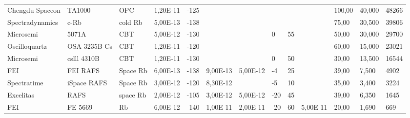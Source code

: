 \begin{table}[H]
{\begin{tabular}{ll|lllllllllll}
            Chengdu Spaceon & TA1000           & OPC           & 1,20E-11      & -125                   & ~              & ~                & ~                      & ~                      & ~               & 100,00         & 40,000          & 48266                   \\
            Spectradynamics & c-Rb             & cold Rb       & 5,00E-13      & -138                   & ~              & ~                & ~                      & ~                      & ~               & 75,00          & 30,500          & 39806                   \\
            Microsemi       & 5071A            & CBT           & 5,00E-12      & -130                   & ~              & ~                & 0                      & 55                     & ~               & 50,00          & 30,000          & 29700                   \\
            Oscilloquartz   & OSA 3235B Cs     & CBT           & 1,20E-11      & -120                   & ~              & ~                & ~                      & ~                      & ~               & 60,00          & 15,000          & 23021                   \\
            Microsemi       & cslll 4310B      & CBT           & 1,20E-11      & -130                   & ~              & ~                & 0                      & 50                     & ~               & 30,00          & 13,500          & 16544                   \\
            FEI             & FEI RAFS         & Space Rb      & 6,00E-13      & -138                   & 9,00E-13       & 5,00E-12         & -4                     & 25                     & ~               & 39,00          & 7,500           & 4902                    \\
            Spectratime     & iSpace RAFS      & Space Rb      & 3,00E-12      & -120                   & 8,30E-12       & ~                & -5                     & 10                     & ~               & 35,00          & 3,400           & 3224                    \\
            Excelitas       & RAFS             & space Rb      & 2,00E-12      & -105                   & 3,00E-12       & 5,00E-12         & -20                    & 45                     & ~               & 39,00          & 6,350           & 1645                    \\
            FEI             & FE-5669          & Rb            & 6,00E-12      & -140                   & 1,00E-11       & 2,00E-11         & -20                    & 60                     & 5,00E-11        & 20,00          & 1,690           & 669                     \\

\end{tabular}}
\end{table}

